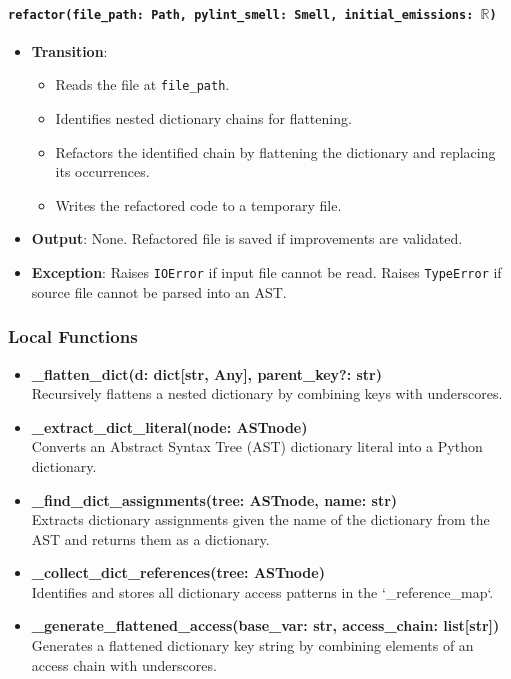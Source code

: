 \documentclass[12pt, titlepage]{article}
\begin{document}
\paragraph{\texttt{refactor(file\_path: Path, pylint\_smell: Smell, initial\_emissions: $\mathbb{R}$)}}
\begin{itemize}
  \item \textbf{Transition}:
    \begin{itemize}
      \item Reads the file at \texttt{file\_path}.
      \item Identifies nested dictionary chains for flattening.
      \item Refactors the identified chain by flattening the dictionary and replacing its occurrences.
      \item Writes the refactored code to a temporary file.
\end{itemize}
  \item \textbf{Output}: None. Refactored file is saved if improvements are validated.
  \item \textbf{Exception}: Raises \texttt{IOError} if input file cannot be read. Raises \texttt{TypeError} if source file cannot be parsed into an AST.
\end{itemize}

\subsubsection{Local Functions}
\begin{itemize}
    \item \textbf{\_flatten\_dict(d: dict[str, Any], parent\_key?: str)} \\
    Recursively flattens a nested dictionary by combining keys with underscores.

    \item \textbf{\_extract\_dict\_literal(node: ASTnode)} \\
    Converts an Abstract Syntax Tree (AST) dictionary literal into a Python dictionary.

    \item \textbf{\_find\_dict\_assignments(tree: ASTnode, name: str)} \\
    Extracts dictionary assignments given the name of the dictionary from the AST and returns them as a dictionary.

    \item \textbf{\_collect\_dict\_references(tree: ASTnode)} \\
    Identifies and stores all dictionary access patterns in the `\_reference\_map`.

    \item \textbf{\_generate\_flattened\_access(base\_var: str, access\_chain: list[str])} \\
    Generates a flattened dictionary key string by combining elements of an access chain with underscores.
\end{itemize}
\end{document}
